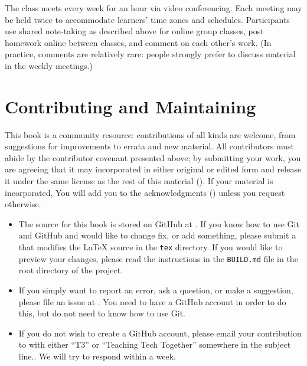 The class meets every week for an hour via video conferencing. Each
meeting may be held twice to accommodate learners' time zones and
schedules.  Participants use shared note-taking as described above for
online group classes, post homework online between classes, and
comment on each other's work. (In practice, comments are relatively
rare: people strongly prefer to discuss material in the weekly
meetings.)

\section{Contributing and Maintaining}\label{s:joining-contributing}

This book is a community resource: contributions of all kinds are
welcome, from suggestions for improvements to errata and new material.
All contributors must abide by the contributor covenant presented
above; by submitting your work, you are agreeing that it may
incorporated in either original or edited form and release it under
the same license as the rest of this material ().
If your material is incorporated, You will add you to the
acknowledgments () unless you request
otherwise.

\begin{itemize}

\item
  The source for this book is stored on GitHub at {\repository}.  If
  you know how to use Git and GitHub and would like to change fix, or
  add something, please submit a  that modifies the LaTeX source in the \texttt{tex}
  directory.  If you would like to preview your changes, please read
  the instructions in the \texttt{BUILD.md} file in the root directory
  of the project.

\item
  If you simply want to report an error, ask a question, or make a
  suggestion, please file an issue at {\repository}. You need to have
  a GitHub account in order to do this, but do not need to know how to
  use Git.

\item
  If you do not wish to create a GitHub account, please email your
  contribution to {\email} with either ``T3'' or ``Teaching Tech
  Together'' somewhere in the subject line..  We will try to respond
  within a week.

\end{itemize}


